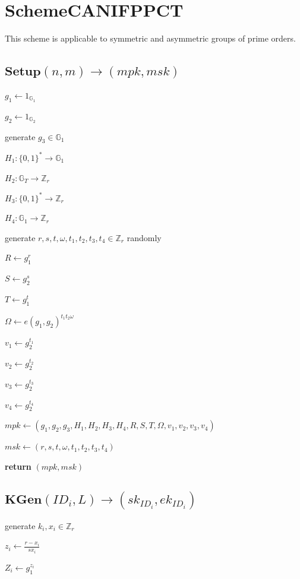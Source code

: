 \documentclass[a4paper]{article}
\begin{document}
\section{SchemeCANIFPPCT}

This scheme is applicable to symmetric and asymmetric groups of prime orders. 

\subsection{$\textbf{Setup}(n, m) \to (\textit{mpk}, \textit{msk})$}

$g_1 \gets 1_{\mathbb{G}_1}$

$g_2 \gets 1_{\mathbb{G}_2}$

generate $g_3 \in \mathbb{G}_1$

$H_1: \{0, 1\}^* \to \mathbb{G}_1$

$H_2: \mathbb{G}_T \to \mathbb{Z}_r$

$H_3: \{0, 1\}^* \to \mathbb{Z}_r$

$H_4: \mathbb{G}_1 \to \mathbb{Z}_r$

generate $r, s, t, \omega, t_1, t_2, t_3, t_4 \in \mathbb{Z}_r$ randomly

$R \gets g_1^r$

$S \gets g_2^s$

$T \gets g_1^t$

$\Omega \gets e(g_1, g_2)^{t_1 t_2 \omega}$

$v_1 \gets g_2^{t_1}$

$v_2 \gets g_2^{t_2}$

$v_3 \gets g_2^{t_3}$

$v_4 \gets g_2^{t_4}$

$\textit{mpk} \gets (g_1, g_2, g_3, H_1, H_2, H_3, H_4, R, S, T, \Omega, v_1, v_2, v_3, v_4)$

$\textit{msk} \gets (r, s, t, \omega, t_1, t_2, t_3, t_4)$

\textbf{return} $(\textit{mpk}, \textit{msk})$

\subsection{$\textbf{KGen}(\textit{ID}_i, L) \to (\textit{sk}_{\textit{ID}_i}, \textit{ek}_{\textit{ID}_i})$}

generate $k_i, x_i \in \mathbb{Z}_r$

$z_i \gets \frac{r - x_i}{s x_i}$

$Z_i \gets g_1^{z_i}$
\end{document}
